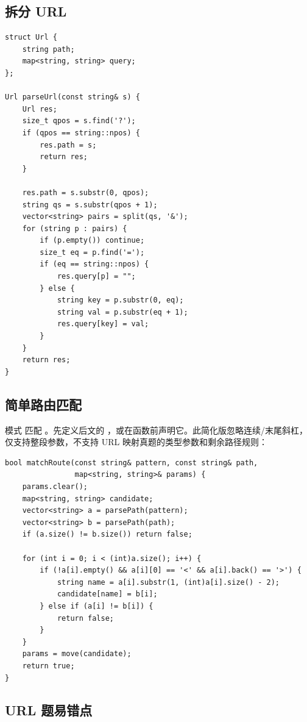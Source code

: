 \subsection{拆分 URL}

\begin{lstlisting}
struct Url {
    string path;
    map<string, string> query;
};

Url parseUrl(const string& s) {
    Url res;
    size_t qpos = s.find('?');
    if (qpos == string::npos) {
        res.path = s;
        return res;
    }

    res.path = s.substr(0, qpos);
    string qs = s.substr(qpos + 1);
    vector<string> pairs = split(qs, '&');
    for (string p : pairs) {
        if (p.empty()) continue;
        size_t eq = p.find('=');
        if (eq == string::npos) {
            res.query[p] = "";
        } else {
            string key = p.substr(0, eq);
            string val = p.substr(eq + 1);
            res.query[key] = val;
        }
    }
    return res;
}
\end{lstlisting}

\subsection{简单路由匹配}

模式  匹配 。先定义后文的 ，或在函数前声明它。此简化版忽略连续/末尾斜杠，仅支持整段参数，不支持 URL 映射真题的类型参数和剩余路径规则：

\begin{lstlisting}
bool matchRoute(const string& pattern, const string& path,
                map<string, string>& params) {
    params.clear();
    map<string, string> candidate;
    vector<string> a = parsePath(pattern);
    vector<string> b = parsePath(path);
    if (a.size() != b.size()) return false;

    for (int i = 0; i < (int)a.size(); i++) {
        if (!a[i].empty() && a[i][0] == '<' && a[i].back() == '>') {
            string name = a[i].substr(1, (int)a[i].size() - 2);
            candidate[name] = b[i];
        } else if (a[i] != b[i]) {
            return false;
        }
    }
    params = move(candidate);
    return true;
}
\end{lstlisting}

\subsection{URL 题易错点}

